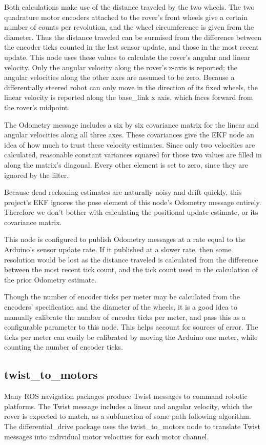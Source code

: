 Both calculations make use of the distance traveled by the two wheels. The two quadrature motor encoders attached to the rover's front wheels give a certain number of counts per revolution, and the wheel circumference is given from the diameter. Thus the distance traveled can be surmised from the difference between the encoder ticks counted in the last sensor update, and those in the most recent update. This node uses these values to calculate the rover's angular and linear velocity. Only the angular velocity along the rover's z-axis is reported; the angular velocities along the other axes are assumed to be zero. Because a differentially steered robot can only move in the direction of its fixed wheels, the linear velocity is reported along the base\_link x axis, which faces forward from the rover's midpoint.

The Odometry message includes a six by six covariance matrix for the linear and angular velocities along all three axes. These covariances give the EKF node an idea of how much to trust these velocity estimates. Since only two velocities are calculated, reasonable constant variances squared for those two values are filled in along the matrix's diagonal. Every other element is set to zero, since they are ignored by the filter. 

Because dead reckoning estimates are naturally noisy and drift quickly, this project's EKF ignores the pose element of this node's Odometry message entirely. Therefore we don't bother with calculating the positional update estimate, or its covariance matrix.

This node is configured to publish Odometry messages at a rate equal to the Arduino's sensor update rate. If it published at a slower rate, then some resolution would be lost as the distance traveled is calculated from the difference between the most recent tick count, and the tick count used in the calculation of the prior Odometry estimate.

Though the number of encoder ticks per meter may be calculated from the encoders' specification and the diameter of the wheels, it is a good idea to manually calibrate the number of encoder ticks per meter, and pass this as a configurable parameter to this node. This helps account for sources of error. The ticks per meter can easily be calibrated by moving the Arduino one meter, while counting the number of encoder ticks.

\subsection{twist\_to\_motors}
Many ROS navigation packages produce Twist messages to command robotic platforms. The Twist message includes a linear and angular velocity, which the rover is expected to match, as a subfunction of some path following algorithm. The differential\_drive package uses the twist\_to\_motors node to translate Twist messages into individual motor velocities for each motor channel. 

